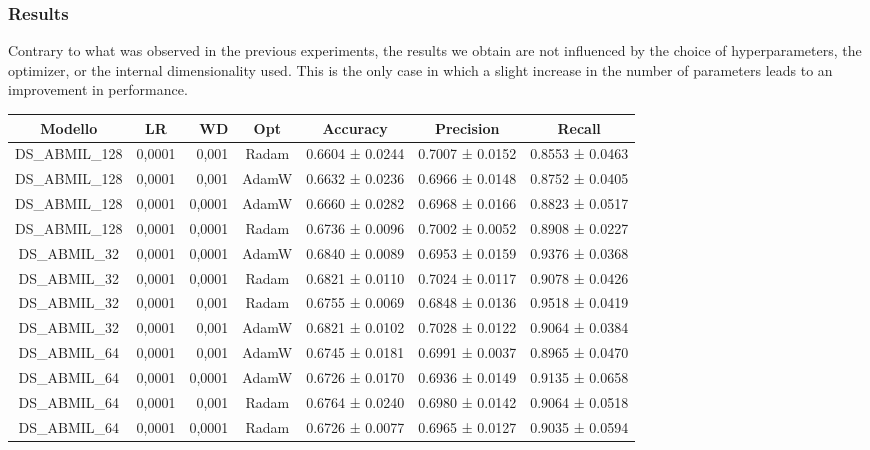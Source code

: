 \documentclass{article}
\begin{document}
\subsubsection{Results}

Contrary to what was observed in the previous experiments, the results we obtain are not influenced by the choice of hyperparameters, the optimizer, or the internal dimensionality used.
This is the only case in which a slight increase in the number of parameters leads to an improvement in performance.

\begin{table}[h]
	\centering
	\begin{tabular}{|c|crc|c|c|c|}
		\hline
		Modello & LR & WD & Opt & Accuracy & Precision & Recall \\
		\hline
		DS\_ABMIL\_128 & 0,0001 & 0,001 & Radam & 0.6604 ± 0.0244 & 0.7007 ± 0.0152 & 0.8553 ± 0.0463 \\
		DS\_ABMIL\_128 & 0,0001 & 0,001 & AdamW & 0.6632 ± 0.0236 & 0.6966 ± 0.0148 & 0.8752 ± 0.0405 \\
		DS\_ABMIL\_128 & 0,0001 & 0,0001 & AdamW & 0.6660 ± 0.0282 & 0.6968 ± 0.0166 & 0.8823 ± 0.0517 \\
		DS\_ABMIL\_128 & 0,0001 & 0,0001 & Radam & 0.6736 ± 0.0096 & 0.7002 ± 0.0052 & 0.8908 ± 0.0227 \\
		DS\_ABMIL\_32 & 0,0001 & 0,0001 & AdamW & 0.6840 ± 0.0089 & 0.6953 ± 0.0159 & 0.9376 ± 0.0368 \\
		DS\_ABMIL\_32 & 0,0001 & 0,0001 & Radam & 0.6821 ± 0.0110 & 0.7024 ± 0.0117 & 0.9078 ± 0.0426 \\
		DS\_ABMIL\_32 & 0,0001 & 0,001 & Radam & 0.6755 ± 0.0069 & 0.6848 ± 0.0136 & 0.9518 ± 0.0419 \\
		DS\_ABMIL\_32 & 0,0001 & 0,001 & AdamW & 0.6821 ± 0.0102 & 0.7028 ± 0.0122 & 0.9064 ± 0.0384 \\
		DS\_ABMIL\_64 & 0,0001 & 0,001 & AdamW & 0.6745 ± 0.0181 & 0.6991 ± 0.0037 & 0.8965 ± 0.0470 \\
		DS\_ABMIL\_64 & 0,0001 & 0,0001 & AdamW & 0.6726 ± 0.0170 & 0.6936 ± 0.0149 & 0.9135 ± 0.0658 \\
		DS\_ABMIL\_64 & 0,0001 & 0,001 & Radam & 0.6764 ± 0.0240 & 0.6980 ± 0.0142 & 0.9064 ± 0.0518\\
		DS\_ABMIL\_64 & 0,0001 & 0,0001 & Radam	&0.6726 ± 0.0077 & 0.6965 ± 0.0127 & 0.9035 ± 0.0594 \\
		\hline
	\end{tabular}
	\begin{tabular}{|c|crc|c|c|}

\end{tabular}
\end{table}
\end{document}
